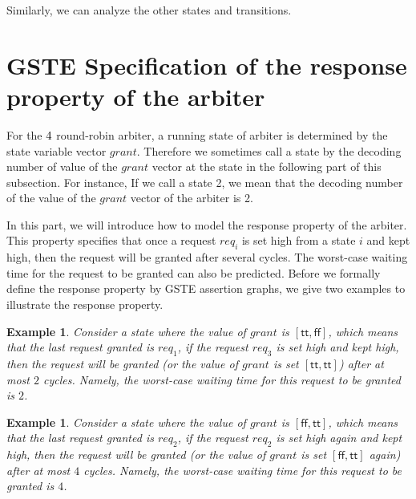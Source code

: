 \documentclass[final]{IEEEtran}
\newtheorem{example}[theorem]{Example}
\begin{document}
Similarly, we can analyze the other states and transitions.


\section{GSTE Specification of the response property of the
arbiter}\label{secLiveness}



 For the $4\time 4$ round-robin arbiter, a running state of arbiter is
 determined  by the state variable vector $grant$. Therefore we
 sometimes call
 a state by   the decoding number of value of the $grant$ vector %
at the state in the following part of this subsection. For instance,
If  we call a state 2, we mean that the decoding number of the value
of the $grant$ vector of the arbiter is 2.



 In this part, we will introduce how to model the
response property of the arbiter. This property specifies that  once a request $req_i$ is
set high from a state $i$ and kept high, then the request will be
granted after several cycles. The worst-case waiting time for the
request to be granted can also be predicted. Before we
 formally define the response property by GSTE assertion graphs, we give two examples to illustrate the response
 property.

 \begin{example}\label{livenessExample1}
Consider a state where the value of $grant$ is $[\mathsf{tt,ff}]$,
which means that the last request granted is $req_{1}$, if the
request $req_{3}$ is set high and kept high, then the request will
be granted (or the value of $grant$ is set $[\mathsf{tt,tt}]$) after
at most $2$ cycles. Namely, the  worst-case waiting time for
 this request to be granted is $2$.
\end{example}

\begin{example}\label{livenessExample2}
Consider a state where the value of $grant$ is $[\mathsf{ff,tt}]$,
which means that the last request granted is $req_{2}$, if the
request $req_{2}$ is set high again and kept high, then the request will
be granted (or the value of $grant $ is set $[\mathsf{ff,tt}]$
again) after at most $4$ cycles. Namely, the  worst-case waiting
time for
 this request to be granted is $4$.
\end{example}
\end{document}
